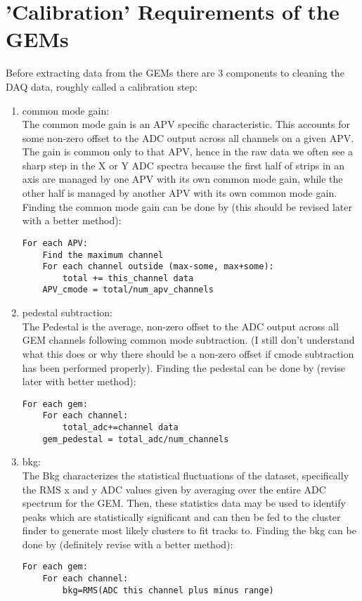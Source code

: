 \documentclass[11pt]{article}
\begin{document}
\section{'Calibration' Requirements of the GEMs}
	Before extracting data from the GEMs there are 3 components to cleaning the DAQ data, roughly called a calibration step: 
	
	\begin{enumerate}
		\item common mode gain: \\
			The common mode gain is an APV specific characteristic. This accounts for some non-zero offset to the ADC output across all channels on a given APV. The gain is common only to that APV, hence in the raw data we often see a sharp step in the X or Y ADC spectra because the first half of strips in an axis are managed by one APV with its own common mode gain, while the other half is managed by another APV with its own common mode gain. \\
		Finding the common mode gain can be done by (this should be revised later with a better method):
		\begin{lstlisting}	
For each APV:
	Find the maximum channel
	For each channel outside (max-some, max+some):
		total += this_channel data
	APV_cmode = total/num_apv_channels	
		\end{lstlisting}
		
		\item pedestal subtraction:\\
			The Pedestal is the average, non-zero offset to the ADC output across all GEM channels following common mode subtraction. (I still don't understand what this does or why there should be a non-zero offset if cmode subtraction has been performed properly).
			Finding the pedestal can be done by (revise later with better method):
		\begin{lstlisting}	
For each gem:
	For each channel:
		total_adc+=channel data
	gem_pedestal = total_adc/num_channels
		\end{lstlisting}
		
		\item bkg: \\
			The Bkg characterizes the statistical fluctuations of the dataset, specifically the RMS x and y ADC values given by averaging over the entire ADC spectrum for the GEM. Then, these statistics data may be used to identify peaks which are statistically significant and can then be fed to the cluster finder to generate most likely clusters to fit tracks to.  
			Finding the bkg can be done by (definitely revise with a better method):
		\begin{lstlisting}	
For each gem:
	For each channel:
		bkg=RMS(ADC this channel plus minus range)
		\end{lstlisting}
		
	\end{enumerate}
	
\end{document}
